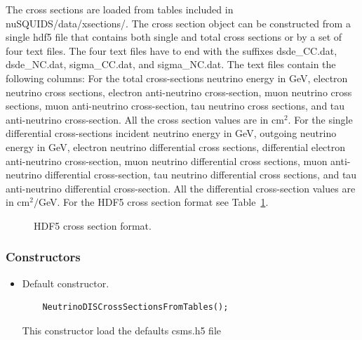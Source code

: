 \documentclass[3p,12pt]{elsarticle}
\newcommand{\ttf}{\ttfamily}
\begin{document}
The cross sections are loaded from tables included in
{\ttfamily nuSQUIDS/data/xsections/}.
The cross section object can be constructed from a single {\ttf hdf5}
file that contains both single and total cross sections or by a set of
four text files. The four text files have to end with the suffixes
{\ttf dsde\_CC.dat}, {\ttf dsde\_NC.dat}, {\ttf sigma\_CC.dat}, and
{\ttf sigma\_NC.dat}.
The text files contain the following columns:
For the total cross-sections neutrino energy in GeV, electron neutrino 
cross sections, electron anti-neutrino cross-section, muon neutrino
cross sections, muon anti-neutrino cross-section, tau neutrino
cross sections, and tau anti-neutrino cross-section. All the cross
section values are in cm$^2$.
For the single differential cross-sections incident neutrino energy in
GeV, outgoing neutrino energy in GeV, electron neutrino 
differential cross sections, differential electron anti-neutrino cross-section, muon neutrino
differential cross sections, muon anti-neutrino differential cross-section, tau neutrino
differential cross sections, and tau anti-neutrino differential
cross-section. All the differential cross-section values are in cm$^2/$GeV.
For the {\ttf HDF5} cross section format see Table~\ref{tab:cross}.

\begin{figure}[htb!]
  \label{tab:cross}
  \centering
  \caption{HDF5 cross section format.}
\end{figure}


\subsubsection{Constructors}

\begin{itemize}
\item Default constructor.
  \begin{lstlisting}
    NeutrinoDISCrossSectionsFromTables();
  \end{lstlisting}
  This constructor load the defaults {\ttf csms.h5} file
\end{itemize}
\end{document}
